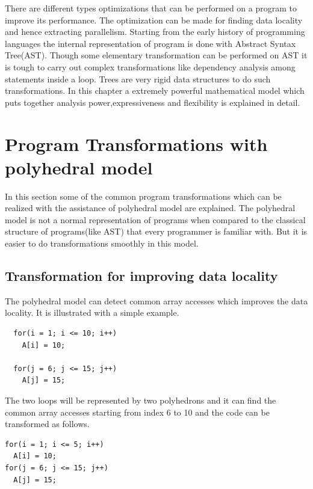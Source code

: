 \label{chap:background}

There are different types optimizations that can be performed on a program to improve its
performance. The optimization can be made for finding data locality and hence extracting
parallelism. Starting from the early history of programming languages the internal representation
of program is done with Abstract Syntax Tree(AST). Though some elementary transformation can
be performed on AST it is tough to carry out complex transformations like dependency analysis among
statements inside a loop. Trees are very rigid data structures to do such transformations.
In this chapter a extremely powerful mathematical model which puts together analysis power,expressiveness and flexibility is explained in detail.

\section{Program Transformations with polyhedral model}

In this section some of the common program transformations which can be realized with the
assistance of polyhedral model are explained. The polyhedral model is not a normal
representation of programs when compared to the
classical structure of programs(like AST) that every programmer is familiar with. But
it is easier to do transformations smoothly in this model.

\subsection{Transformation for improving data locality}

The polyhedral model can detect common array accesses which improves the data locality. It is
illustrated with a simple example.
{\footnotesize
\begin{lstlisting}
  for(i = 1; i <= 10; i++)
    A[i] = 10;
  
  for(j = 6; j <= 15; j++)
    A[j] = 15;
\end{lstlisting}
}

The two loops will be represented by two polyhedrons and it can find the common 
array accesses starting from index 6 to 10 and the code can be transformed as follows.

{\footnotesize
\begin{lstlisting}
for(i = 1; i <= 5; i++)
  A[i] = 10;
for(j = 6; j <= 15; j++)
  A[j] = 15;
\end{lstlisting}
}


